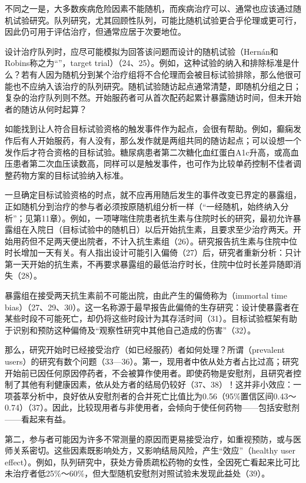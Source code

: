 不同之一是，大多数疾病危险因素不能随机，而疾病治疗可以、通常也应该通过随机试验研究。队列研究，尤其回顾性队列，可能比随机试验更合乎伦理或更可行，因此仍可用于评估治疗，但通常应居于次要地位。

设计治疗队列时，应尽可能模拟为回答该问题而设计的随机试验（Hernán和Robins称之为“”，target trial）（24、25）。例如，这种试验的纳入和排除标准是什么？若有人因为随机分到某个治疗组将不合伦理而会被目标试验排除，那么他很可能也不应纳入该治疗的队列研究。随机试验随访起点通常清楚，即随机分组之日；复杂的治疗队列则不然。开始服药者可从首次配药起累计暴露随访时间，但未开始者的随访从何时起算？

如能找到让人符合目标试验资格的触发事件作为起点，会很有帮助。例如，癫痫发作后有人开始服药，有人没有，那么发作就是两组共同的随访起点；可以设想一个发作后才符合资格的目标试验。糖尿病患者第二次糖化血红蛋白A1c升高，或高血压患者第二次血压读数高，同样可以是触发事件，也可作为比较单药控制不佳者调整药物方案的目标试验纳入标准。

一旦确定目标试验资格的时点，就不应再用随后发生的事件改变已界定的暴露组，正如随机分到治疗的参与者必须按原随机组分析一样（“一经随机，始终纳入分析”；见第11章）。例如，一项哮喘住院患者抗生素与住院时长的研究，最初允许暴露组在入院日（目标试验中的随机日）以后开始抗生素，且要求至少治疗两天。开始用药但不足两天便出院者，不计入抗生素组（26）。研究报告抗生素与住院中位时长增加一天有关。有人指出设计可能引入偏倚（27）后，研究者重新分析：只计第一天开始的抗生素，不再要求暴露组的最低治疗时长，住院中位时长差异随即消失（28）。

暴露组在接受两天抗生素前不可能出院，由此产生的偏倚称为（immortal time bias）（27、29、30）。这一名称源于最早报告此偏倚的生存研究：设计使暴露者在某些时段不可能死亡，却仍将这些时段计为其存活时间（31）。目标试验框架有助于识别和预防这种偏倚及“观察性研究中其他自己造成的伤害”（32）。

那么，研究开始时已经接受治疗（如已经服药）者如何处理？所谓（prevalent users）的研究有数个问题（33—36）。第一，现用者中依从处方者占比过高；研究开始前已因任何原因停药者，不会被算作使用者。即使药物是安慰剂，且研究者控制了其他有利健康因素，依从处方者的结局仍较好（37、38）！这并非小效应：一项荟萃分析中，良好依从安慰剂者的合并死亡比值比为0.56（95\%置信区间0.43～0.74）（37）。因此，比较现用者与非使用者，会倾向于使任何药物——包括安慰剂——看起来有益。

第二，参与者可能因为许多不常测量的原因而更易接受治疗，如重视预防，或与医师关系密切。这些因素既影响处方，又影响结局风险，产生“效应”（healthy user effect）。例如，队列研究中，获处方骨质疏松药物的女性，全因死亡看起来比可比未治疗者低25\%～60\%，但大型随机安慰剂对照试验未发现此益处（39）。

